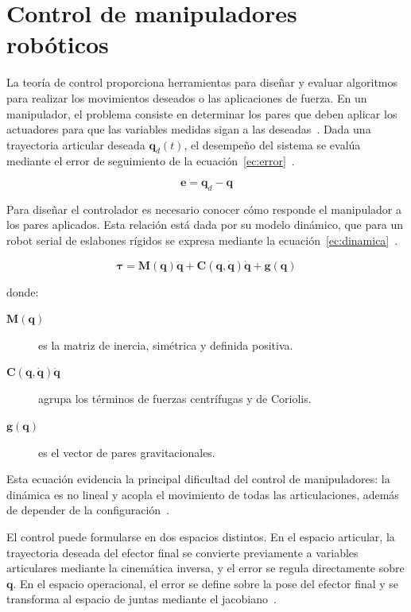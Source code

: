 \section{Control de manipuladores robóticos}

La teoría de control proporciona herramientas para diseñar y evaluar algoritmos para realizar los movimientos deseados o las aplicaciones de fuerza. En un manipulador, el problema consiste en determinar los pares que deben aplicar los actuadores para que las variables medidas sigan a las deseadas~\cite{craig}. Dada una trayectoria articular deseada $\mathbf{q}_d(t)$, el desempeño del sistema se evalúa mediante el error de seguimiento de la ecuación~\ref{ec:error}~\cite{handbook_motion}.

\begin{equation}
\label{ec:error}
    \mathbf{e} = \mathbf{q}_d - \mathbf{q}
\end{equation}

Para diseñar el controlador es necesario conocer cómo responde el manipulador a los pares aplicados. Esta relación está dada por su modelo dinámico, que para un robot serial de eslabones rígidos se expresa mediante la ecuación~\ref{ec:dinamica}~\cite{craig,handbook_motion}.

\begin{equation}
\label{ec:dinamica}
    \boldsymbol{\tau} = \mathbf{M}(\mathbf{q})\ddot{\mathbf{q}} + \mathbf{C}(\mathbf{q},\dot{\mathbf{q}})\dot{\mathbf{q}} + \mathbf{g}(\mathbf{q})
\end{equation}

donde:
\begin{description}
    \item[$\mathbf{M}(\mathbf{q})$] es la matriz de inercia, simétrica y definida positiva.
    \item[$\mathbf{C}(\mathbf{q},\dot{\mathbf{q}})\dot{\mathbf{q}}$] agrupa los términos de fuerzas centrífugas y de Coriolis.
    \item[$\mathbf{g}(\mathbf{q})$] es el vector de pares gravitacionales.
\end{description}

Esta ecuación evidencia la principal dificultad del control de manipuladores: la dinámica es no lineal y acopla el movimiento de todas las articulaciones, además de depender de la configuración~\cite{handbook_motion}.

El control puede formularse en dos espacios distintos. En el espacio articular, la trayectoria deseada del efector final se convierte previamente a variables articulares mediante la cinemática inversa, y el error se regula directamente sobre $\mathbf{q}$. En el espacio operacional, el error se define sobre la pose del efector final y se transforma al espacio de juntas mediante el jacobiano~\cite{craig,handbook_motion}.

